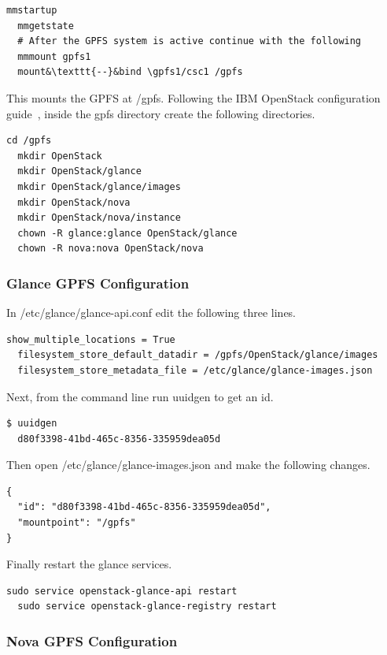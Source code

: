 \begin{lstlisting}[escapechar=&]
  mmstartup
  mmgetstate
  # After the GPFS system is active continue with the following
  mmmount gpfs1
  mount&\texttt{--}&bind \gpfs1/csc1 /gpfs
\end{lstlisting}
 
This mounts the GPFS at /gpfs. Following the IBM OpenStack configuration
guide~\cite{GPFSsetup}, inside the gpfs directory create the following 
directories. 

\begin{lstlisting}[escapechar=&]
  cd /gpfs
  mkdir OpenStack
  mkdir OpenStack/glance
  mkdir OpenStack/glance/images
  mkdir OpenStack/nova
  mkdir OpenStack/nova/instance
  chown -R glance:glance OpenStack/glance
  chown -R nova:nova OpenStack/nova
\end{lstlisting}

\subsubsection{Glance GPFS Configuration}

In /etc/glance/glance-api.conf edit the following three lines.

\begin{lstlisting}[escapechar=&]
  show_multiple_locations = True
  filesystem_store_default_datadir = /gpfs/OpenStack/glance/images
  filesystem_store_metadata_file = /etc/glance/glance-images.json
\end{lstlisting}

Next, from the command line run uuidgen to get an id.

\begin{lstlisting}[escapechar=&]
  $ uuidgen
  d80f3398-41bd-465c-8356-335959dea05d
\end{lstlisting}

Then open /etc/glance/glance-images.json and make the following changes.
\begin{lstlisting}[escapechar=&]
{
  "id": "d80f3398-41bd-465c-8356-335959dea05d",
  "mountpoint": "/gpfs"
}
\end{lstlisting}

Finally restart the glance services.
\begin{lstlisting}[escapechar=&]
  sudo service openstack-glance-api restart
  sudo service openstack-glance-registry restart
\end{lstlisting}

\subsubsection{Nova GPFS Configuration}

